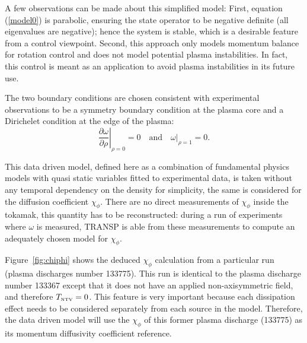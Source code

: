 \documentclass[12pt]{iopart}
\begin{document}
A few observations can be made about this simplified model: First, equation  (\ref{model0}) is parabolic, ensuring the state operator to be negative definite (all eigenvalues are negative);  hence the system is stable, which is a desirable feature from a control viewpoint. 
Second, this approach only models momentum balance for rotation control and does not model potential plasma instabilities.
In fact, this control is meant as an application to avoid plasma instabilities in its future use.
  
The two boundary conditions are chosen consistent with experimental observations to be a symmetry boundary condition at the plasma core and a Dirichelet condition at the edge of the plasma:
\begin{equation}
\left.\frac{\partial\omega}{\partial\rho}\right|_{\rho=0} = 0 
\quad \textrm{and} \quad 
\left.\omega\right|_{\rho=1} = 0.
\label{bc0}
\end{equation}

This data driven model, defined here as a combination of fundamental physics models with quasi static variables fitted to experimental data,  is taken without any temporal dependency on the density  for simplicity, the same is considered for the diffusion coefficient $\chi_\phi$. There are no direct measurements of $\chi_\phi$ inside the tokamak, this quantity has to be reconstructed: during a run of experiments where $\omega$ is measured, TRANSP is able from these measurements to compute an adequately chosen model for  $\chi_\phi$. 

Figure~{\ref{fig:chiphi}} shows the deduced $\chi_\phi$ calculation from a particular run (plasma discharges number 133775). This run is identical to the plasma discharge number 133367 except that it does not have an applied non-axisymmetric field, and therefore $T_\textrm{\tiny NTV} = 0$. This feature is very important because each dissipation effect needs to be considered separately from each source in the model. Therefore, the data driven model will use the $\chi_\phi$ of this former plasma discharge (133775) as its momentum diffusivity coefficient reference.
\end{document}

